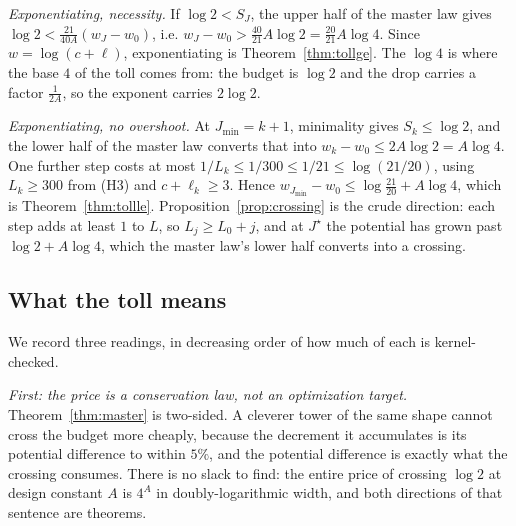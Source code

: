 \documentclass[11pt]{amsart}
\theoremstyle{remark}
\begin{document}
\emph{Exponentiating, necessity.} If $\log 2 < S_J$, the upper half of the
master law gives $\log 2 < \frac{21}{40A}(w_J - w_0)$, i.e.
$w_J - w_0 > \frac{40}{21}A\log 2 = \frac{20}{21}A\log 4$. Since
$w = \log(c+\ell)$, exponentiating is Theorem~\ref{thm:tollge}. The
$\log 4$ is where the base $4$ of the toll comes from: the budget is
$\log 2$ and the drop carries a factor $\frac{1}{2A}$, so the exponent
carries $2\log 2$.

\emph{Exponentiating, no overshoot.} At $J_{\min} = k+1$, minimality gives
$S_k \le \log 2$, and the lower half of the master law converts that into
$w_k - w_0 \le 2A\log 2 = A \log 4$. One further step costs at most
$1/L_k \le 1/300 \le 1/21 \le \log(21/20)$, using $L_k \ge 300$ from (H3)
and $c + \ell_k \ge 3$. Hence
$w_{J_{\min}} - w_0 \le \log\frac{21}{20} + A\log 4$, which is
Theorem~\ref{thm:tollle}. Proposition~\ref{prop:crossing} is the crude
direction: each step adds at least $1$ to $L$, so $L_j \ge L_0 + j$, and
at $J^\star$ the potential has grown past $\log 2 + A\log 4$, which the
master law's lower half converts into a crossing.

\subsection{What the toll means}
We record three readings, in decreasing order of how much of each is
kernel-checked.

\emph{First: the price is a conservation law, not an optimization
target.} Theorem~\ref{thm:master} is two-sided. A cleverer tower of the
same shape cannot cross the budget more cheaply, because the decrement it
accumulates is its potential difference to within $5\%$, and the potential
difference is exactly what the crossing consumes. There is no slack to
find: the entire price of crossing $\log 2$ at design constant $A$ is
$4^{A}$ in doubly-logarithmic width, and both directions of that sentence
are theorems.
\end{document}
